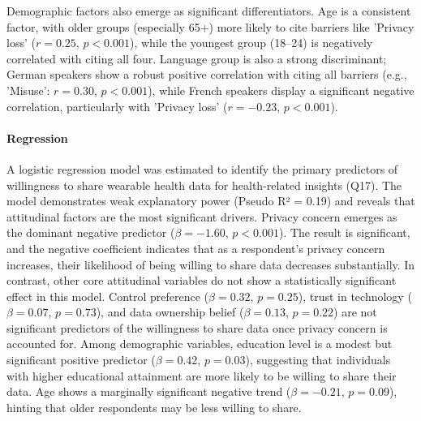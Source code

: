 		Demographic factors also emerge as significant differentiators. Age is a consistent factor, with older groups (especially 65+) more likely to cite barriers like 'Privacy loss' ($r = 0.25$, $p < 0.001$), while the youngest group (18--24) is negatively correlated with citing all four. Language group is also a strong discriminant; German speakers show a robust positive correlation with citing all barriers (e.g., 'Misuse': $r = 0.30$, $p < 0.001$), while French speakers display a significant negative correlation, particularly with 'Privacy loss' ($r = -0.23$, $p < 0.001$).

		\paragraph{Regression}
		A logistic regression model was estimated to identify the primary predictors of willingness to share wearable health data for health-related insights (Q17). The model demonstrates weak explanatory power (Pseudo R² = 0.19) and reveals that attitudinal factors are the most significant drivers.
		Privacy concern emerges as the dominant negative predictor ($\beta = -1.60$, $p < 0.001$). The result is significant, and the negative coefficient indicates that as a respondent's privacy concern increases, their likelihood of being willing to share data decreases substantially.
		In contrast, other core attitudinal variables do not show a statistically significant effect in this model. Control preference ($\beta = 0.32$, $p = 0.25$), trust in technology ($\beta = 0.07$, $p = 0.73$), and data ownership belief ($\beta = 0.13$, $p = 0.22$) are not significant predictors of the willingness to share data once privacy concern is accounted for.
		Among demographic variables, education level is a modest but significant positive predictor ($\beta = 0.42$, $p = 0.03$), suggesting that individuals with higher educational attainment are more likely to be willing to share their data. Age shows a marginally significant negative trend ($\beta = -0.21$, $p = 0.09$), hinting that older respondents may be less willing to share.
